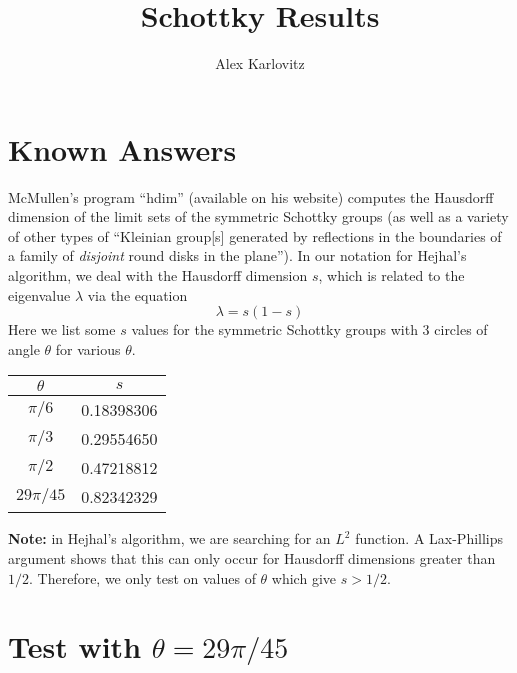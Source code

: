 \documentclass[]{article}
\title{Schottky Results}
\author{Alex Karlovitz}
\date{}
\begin{document}
	
	\maketitle

\section*{Known Answers}

McMullen's program ``hdim'' (available on his website) computes the Hausdorff dimension of the limit sets of the symmetric Schottky groups (as well as a variety of other types of ``Kleinian group[s] generated by reflections in the boundaries of a family of \textit{disjoint} round disks in the plane'').
In our notation for Hejhal's algorithm, we deal with the Hausdorff dimension $s$, which is related to the eigenvalue $\lambda$ via the equation
$$
\lambda = s(1 - s)
$$
Here we list some $s$ values for the symmetric Schottky groups with 3 circles of angle $\theta$ for various $\theta$.
\begin{center}
	\begin{tabular}{c|c}
		$\theta$ & $s$ \\
		\hline
		$\pi/6$ & 0.18398306 \\
		$\pi/3$ & 0.29554650 \\
		$\pi/2$ & 0.47218812 \\
		$29\pi/45$ & 0.82342329
	\end{tabular}
\end{center}
\textbf{Note:} in Hejhal's algorithm, we are searching for an $L^2$ function.
A Lax-Phillips argument shows that this can only occur for Hausdorff dimensions greater than $1/2$.
Therefore, we only test on values of $\theta$ which give $s > 1/2$.

\section*{Test with $\theta = 29\pi/45$}
\end{document}
